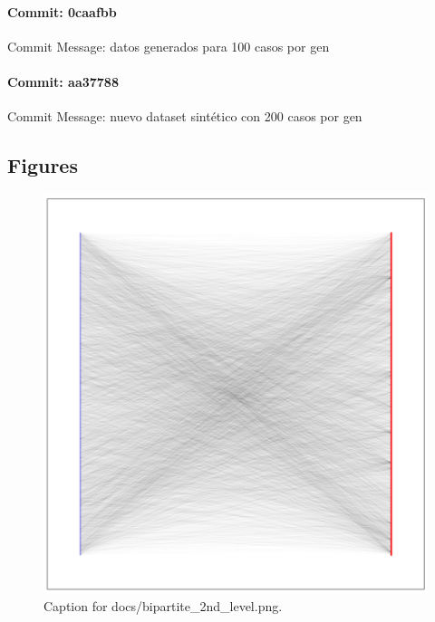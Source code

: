 \documentclass{article}
\begin{document}
\paragraph{Commit: 0caafbb}
Commit Message: datos generados para 100 casos por gen

\paragraph{Commit: aa37788}
Commit Message: nuevo dataset sintético con 200 casos por gen

\subsection{Figures}
\begin{figure}[h] \centering \includegraphics{docs/bipartite_2nd_level.png} \caption{Caption for docs/bipartite_2nd_level.png.} \end{figure}
\end{document}
